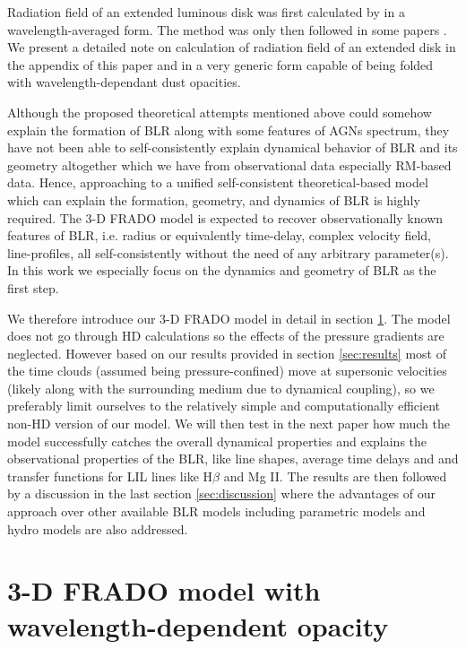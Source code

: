 \documentclass[twocolumn]{aastex62}
\begin{document}
Radiation field of an extended luminous disk was first calculated by \citet{icke1980} in a wavelength-averaged form. The method was only then followed in some papers \citep{Pereyra1997, proga1998, proga1999, proga2000, proga2004, feldmeier1999, Watarai1999, Hirai2001, Nomura2020}.
We present a detailed note on calculation of radiation field of an extended disk in the appendix of this paper and in a very generic form capable of being folded with wavelength-dependant dust opacities.

Although the proposed theoretical attempts mentioned above could somehow explain the formation of BLR along with some features of AGNs spectrum, they have not been able to self-consistently explain dynamical behavior of BLR and its geometry altogether which we have from observational data especially RM-based data. Hence, approaching to a unified self-consistent theoretical-based model which can explain the formation, geometry, and dynamics of BLR is highly required. The 3-D FRADO model is expected to recover observationally known features of BLR, i.e. radius or equivalently time-delay, complex velocity field, line-profiles, all self-consistently without the need of any arbitrary parameter(s). In this work we especially focus on the dynamics and geometry of BLR as the first step.

We therefore introduce our 3-D FRADO model in detail in section \ref{sec:realmodel}. The model does not go through HD calculations so the effects of the pressure gradients are neglected. However based on our results provided in section \ref{sec:results} most of the time clouds (assumed being pressure-confined) move at supersonic velocities (likely along with the surrounding medium due to dynamical coupling), so we preferably limit ourselves to the relatively simple and computationally efficient non-HD version of our model. We will then test in the next paper how much the model successfully catches the overall dynamical properties and explains the observational properties of the BLR, like line shapes, average time delays and and transfer functions for LIL lines like H$\beta$ and Mg II. The results are then followed by a discussion in the last section \ref{sec:discussion} where the advantages of our approach over other available BLR models including parametric models and hydro models are also addressed.

\section{3-D FRADO model with wavelength-dependent opacity} \label{sec:realmodel}
\end{document}
